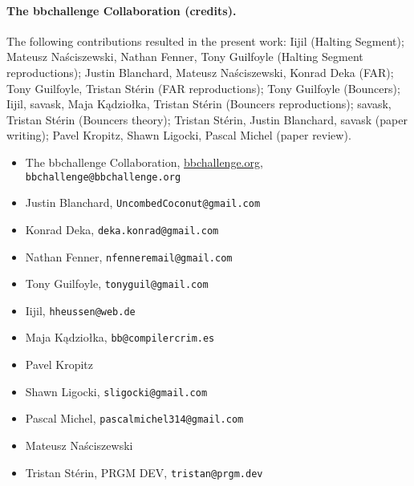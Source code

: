 \documentclass[a4paper,british]{article}
\theoremstyle{definition} %
\numberwithin{equation}{section}
\theoremstyle{definition} %
\begin{document}
\paragraph{The bbchallenge Collaboration (credits).} The following contributions resulted in the present work: Iijil (Halting Segment); Mateusz Na\'{s}ciszewski, Nathan Fenner, Tony Guilfoyle (Halting Segment reproductions); Justin Blanchard, Mateusz Naściszewski, Konrad Deka (FAR); Tony Guilfoyle, Tristan Stérin (FAR reproductions); Tony Guilfoyle (Bouncers); Iijil, savask, Maja Kądziołka, Tristan Stérin (Bouncers reproductions); savask, Tristan Stérin (Bouncers theory); Tristan Stérin, Justin Blanchard, savask (paper writing); Pavel Kropitz, Shawn Ligocki, Pascal Michel (paper review).

\begin{itemize}
  \item The bbchallenge Collaboration, \url{bbchallenge.org}, \texttt{bbchallenge@bbchallenge.org}
  \item Justin Blanchard, \texttt{UncombedCoconut@gmail.com}
  \item Konrad Deka, \texttt{deka.konrad@gmail.com}
  \item Nathan Fenner, \texttt{nfenneremail@gmail.com}
  \item Tony Guilfoyle, \texttt{tonyguil@gmail.com}
  \item Iijil, \texttt{hheussen@web.de}
  \item Maja Kądziołka, \texttt{bb@compilercrim.es}
  \item Pavel Kropitz
  \item Shawn Ligocki, \texttt{sligocki@gmail.com}
  \item Pascal Michel, \texttt{pascalmichel314@gmail.com}
  \item Mateusz Na\'{s}ciszewski
  \item Tristan Stérin, PRGM DEV, \texttt{tristan@prgm.dev}
\end{itemize}




\end{document}
